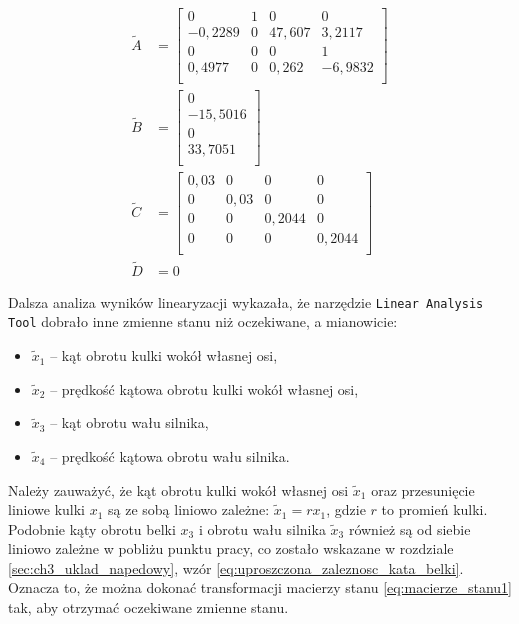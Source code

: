 \begin{align}
    \widetilde{A} &= \begin{bmatrix}
        0 & 1 & 0 & 0 \\
        -0,2289 & 0 & 47,607 & 3,2117 \\
        0 & 0 & 0 & 1 \\
        0,4977 & 0 & 0,262 & -6,9832 \\
    \end{bmatrix} \nonumber \\
    \widetilde{B} &= \begin{bmatrix}
        0 \\
        -15,5016 \\
        0 \\
        33,7051 \\
    \end{bmatrix} \nonumber \\
    \widetilde{C} &= \begin{bmatrix}
            0,03 & 0 & 0 & 0 \\
            0 & 0,03 & 0 & 0 \\
            0 & 0 & 0,2044 & 0 \\
            0 & 0 & 0 & 0,2044 \\
    \end{bmatrix} \nonumber \\
    \widetilde{D} &= 0 \label{eq:macierze_stanu1}
\end{align}

Dalsza analiza wyników linearyzacji wykazała, że narzędzie \texttt{Linear Analysis Tool} dobrało inne zmienne stanu niż oczekiwane, a mianowicie:

\begin{itemize}
    \item $\tilde{x}_1$ -- kąt obrotu kulki wokół własnej osi,
    \item $\tilde{x}_2$ -- prędkość kątowa obrotu kulki wokół własnej osi,
    \item $\tilde{x}_3$ -- kąt obrotu wału silnika,
    \item $\tilde{x}_4$ -- prędkość kątowa obrotu wału silnika.
\end{itemize}

Należy zauważyć, że kąt obrotu kulki wokół własnej osi $\tilde{x}_1$ oraz przesunięcie liniowe kulki $x_1$ są ze sobą liniowo zależne: $\tilde{x}_1 = r x_1$, gdzie $r$ to promień kulki. Podobnie kąty obrotu belki $x_3$ i obrotu wału silnika $\tilde{x}_3$ również są od siebie liniowo zależne w pobliżu punktu pracy, co zostało wskazane w rozdziale \ref{sec:ch3_uklad_napedowy}, wzór \eqref{eq:uproszczona_zaleznosc_kata_belki}. Oznacza to, że można dokonać transformacji macierzy stanu \eqref{eq:macierze_stanu1} tak, aby otrzymać oczekiwane zmienne stanu.

